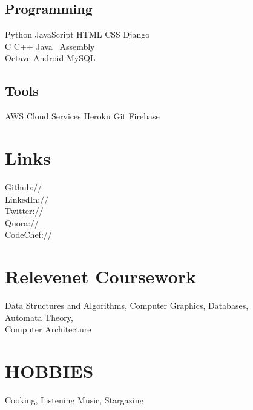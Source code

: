 \documentclass[]{openfont}
\begin{document}
\begin{minipage}[t]{0.33\textwidth}
\subsection{Programming}
Python \textbullet{} JavaScript \textbullet{} HTML \textbullet{} CSS \textbullet{} Django \textbullet{}  \\ 
C \textbullet{} C++ \textbullet{} Java\ \textbullet{} Assembly \\
Octave \textbullet{} \textbullet{} Android \textbullet{} MySQL

\sectionsep
\subsection{Tools}
AWS Cloud Services \textbullet{} Heroku \textbullet{} Git \textbullet{} Firebase

\sectionsep


\section{Links} 
Github:// \href{https://github.com/rajujha373}{} \\
LinkedIn://  \href{https://www.linkedin.com/in/rajujha373}{} \\
Twitter://  \href{https://twitter.com/encipherer889}{} \\
Quora://  \href{https://www.quora.com/profile/Raju-Jha-3}{}\\
CodeChef:// \href{https://www.quora.com/encipherer889}{}
\sectionsep


\section{Relevenet Coursework}
Data Structures and
Algorithms, Computer
Graphics, Databases, \\
Automata Theory, \\
Computer Architecture
\sectionsep

\section{HOBBIES}
Cooking, Listening Music, Stargazing
\sectionsep

%
%

\end{minipage} 
\end{document}
